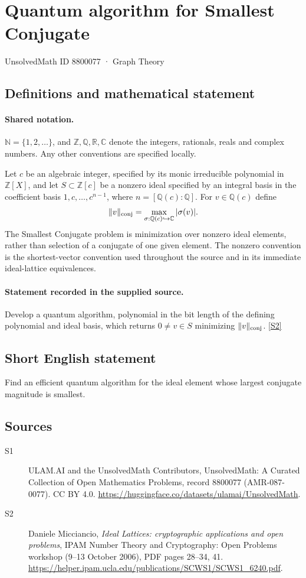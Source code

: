 \documentclass[11pt]{article}
\newcommand{\sref}[2]{\hyperlink{source:#1:#2}{[S#2]}}
\begin{document}
\setcounter{section}{8800076}
\section{Quantum algorithm for Smallest Conjugate}\label{8800077}
{\small\sffamily UnsolvedMath ID 8800077 · Graph Theory}
\subsection{Definitions and mathematical statement}

\paragraph{Shared notation.}$\mathbb N=\{1,2,\ldots\}$, and $\mathbb Z,\mathbb Q,\mathbb R,\mathbb C$ denote the integers, rationals, reals and complex numbers. Any other conventions are specified locally.


Let $c$ be an algebraic integer, specified by its monic irreducible polynomial in $\mathbb Z[X]$, and let $S\subset\mathbb Z[c]$ be a nonzero ideal specified by an integral basis in the coefficient basis $1,c,\ldots,c^{n-1}$, where $n=[\mathbb Q(c):\mathbb Q]$. For $v\in\mathbb Q(c)$ define
\[
\|v\|_{\rm conj}=\max_{\sigma:\mathbb Q(c)\hookrightarrow\mathbb C}|\sigma(v)|.
\]
The Smallest Conjugate problem is minimization over nonzero ideal elements, rather than selection of a conjugate of one given element. The nonzero convention is the shortest-vector convention used throughout the source and in its immediate ideal-lattice equivalences.
\paragraph{Statement recorded in the supplied source.}
Develop a quantum algorithm, polynomial in the bit length of the defining polynomial and ideal basis, which returns $0\ne v\in S$ minimizing $\|v\|_{\rm conj}$. \sref{8800077}{2}

\subsection{Short English statement}
Find an efficient quantum algorithm for the ideal element whose largest conjugate magnitude is smallest.
\subsection{Sources}
\begin{description}
\item[\hypertarget{source:8800077:1}{S1}] ULAM.AI and the UnsolvedMath Contributors, UnsolvedMath: A Curated Collection of Open Mathematics Problems, record 8800077 (AMR-087-0077). CC BY 4.0. \url{https://huggingface.co/datasets/ulamai/UnsolvedMath}.
\item[\hypertarget{source:8800077:2}{S2}] Daniele Micciancio, \emph{Ideal Lattices: cryptographic applications and open problems}, IPAM Number Theory and Cryptography: Open Problems workshop (9--13 October 2006), PDF pages 28--34, 41. \url{https://helper.ipam.ucla.edu/publications/SCWS1/SCWS1_6240.pdf}.
\end{description}
\label{end:8800077}
\end{document}
